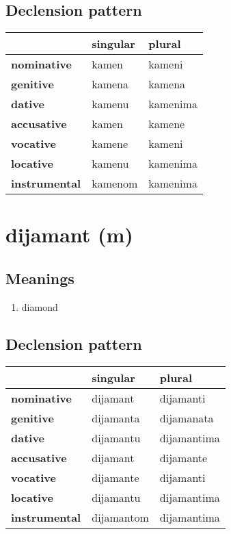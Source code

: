 \subsection*{Declension pattern}
\begin{tabularx}{\linewidth}{Xll}
\toprule
{} & singular &    plural \\
\midrule
\textbf{nominative  } &    kamen &    kameni \\
\textbf{genitive    } &   kamena &    kamena \\
\textbf{dative      } &   kamenu &  kamenima \\
\textbf{accusative  } &    kamen &    kamene \\
\textbf{vocative    } &   kamene &    kameni \\
\textbf{locative    } &   kamenu &  kamenima \\
\textbf{instrumental} &  kamenom &  kamenima \\
\bottomrule
\end{tabularx}

\filbreak
\section{dijamant (m)}
\subsection*{Meanings}
\begin{enumerate}
\item diamond
\end{enumerate}
\subsection*{Declension pattern}
\begin{tabularx}{\linewidth}{Xll}
\toprule
{} &    singular &       plural \\
\midrule
\textbf{nominative  } &    dijamant &    dijamanti \\
\textbf{genitive    } &   dijamanta &   dijamanata \\
\textbf{dative      } &   dijamantu &  dijamantima \\
\textbf{accusative  } &    dijamant &    dijamante \\
\textbf{vocative    } &   dijamante &    dijamanti \\
\textbf{locative    } &   dijamantu &  dijamantima \\
\textbf{instrumental} &  dijamantom &  dijamantima \\
\bottomrule
\end{tabularx}

